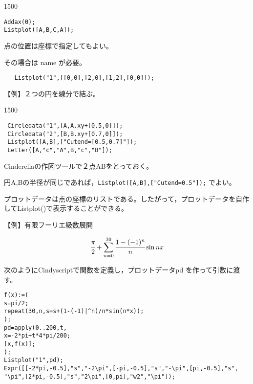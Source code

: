 \documentclass[papersize,a4paper,10pt,uplatex]{jsarticle}
\begin{document}
\begin{description}
\begin{layer}{150}{0}
\end{layer}
\hspace{20mm}

\begin{verbatim}
Addax(0);
Listplot([A,B,C,A]);
\end{verbatim}

点の位置は座標で指定してもよい。

その場合は name が必要。

\verb|   Listplot("1",[[0,0],[2,0],[1,2],[0,0]]);|

\vspace{\baselineskip}
【例】２つの円を線分で結ぶ。

\begin{layer}{150}{0}
\end{layer}
\hspace{20mm}

\begin{verbatim}
 Circledata("1",[A,A.xy+[0.5,0]]);
 Circledata("2",[B,B.xy+[0.7,0]]);
 Listplot([A,B],["Cutend=[0.5,0.7]"]);
 Letter([A,"c","A",B,"c","B"]);
\end{verbatim}
Cinderellaの作図ツールで２点ABをとっておく。

円A,Bの半径が同じであれば，\verb|Listplot([A,B],["Cutend=0.5"]);| でよい。

\vspace{\baselineskip}
プロットデータは点の座標のリストである。したがって，プロットデータを自作してListplot()で表示することができる。

\vspace{\baselineskip}
【例】有限フーリエ級数展開

 \[\cfrac{\pi}{2}+\sum_{n=0}^{30} \cfrac{1-(-1)^n}{n}\sin nx\]

次のようにCindyscriptで関数を定義し，プロットデータpd を作って引数に渡す。
\begin{verbatim}
f(x):=(
s=pi/2;
repeat(30,n,s=s+(1-(-1)|^n)/n*sin(n*x));
);
pd=apply(0..200,t,
x=-2*pi+t*4*pi/200;
[x,f(x)];
);
Listplot("1",pd);
Expr([[-2*pi,-0.5],"s","-2\pi",[-pi,-0.5],"s","-\pi",[pi,-0.5],"s",
"\pi",[2*pi,-0.5],"s","2\pi",[0,pi],"w2","\pi"]);
\end{verbatim}

\vspace{\baselineskip}
\hspace{20mm}


\end{description}
\end{document}
